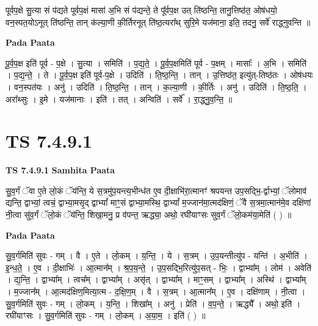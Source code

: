\documentclass[17pt]{extarticle}
\begin{document}
पूर्वप॒क्षे सु॒त्या सं प॑द्यते पूर्वप॒क्षं मासा॑ अ॒भि सं प॑द्यन्ते॒ ते पू᳚र्वप॒क्ष उत् ति॑ष्ठन्ति॒ तानु॒त्तिष्ठ॑त॒ ओष॑धयो॒ वन॒स्पत॒योऽनूत् ति॑ष्ठन्ति॒ तान् क॑ल्या॒णी की॒र्तिरनूत् ति॑ष्ठ॒त्यरा᳚थ् सुरि॒मे यज॑माना॒ इति॒ तदनु॒ सर्वे॑ राद्ध्नुवन्ति ॥ \newline

\textbf{Pada Paata} \newline

पू॒र्व॒प॒क्ष इति॑ पूर्व - प॒क्षे । सु॒त्या । समिति॑ । प॒द्य॒ते॒ । पू॒र्व॒प॒क्षमिति॑ पूर्व - प॒क्षम् । मासाः᳚ । अ॒भि । समिति॑ । प॒द्य॒न्ते॒ । ते । पू॒र्व॒प॒क्ष इति॑ पूर्व-प॒क्षे । उदिति॑ । ति॒ष्ठ॒न्ति॒ । तान् । उ॒त्तिष्ठ॑त॒ इत्यु॑त्-तिष्ठ॑तः । ओष॑धयः । वन॒स्पत॑यः । अनु॑ । उदिति॑ । ति॒ष्ठ॒न्ति॒ । तान् । क॒ल्या॒णी । की॒र्तिः । अनु॑ । उदिति॑ । ति॒ष्ठ॒ति॒ । अरा᳚थ्सुः । इ॒मे । यज॑मानाः । इति॑ । तत् । अन्विति॑ । सर्वे᳚ । रा॒द्ध्नु॒व॒न्ति॒ ॥  \newline




\section*{ TS 7.4.9.1 }

\textbf{TS 7.4.9.1 } \newline
\textbf{Samhita Paata} \newline

सु॒व॒र्गं ॅवा ए॒ते लो॒कं ॅय॑न्ति॒ ये स॒त्रमु॑प॒यन्त्य॒भीन्ध॑त ए॒व दी॒क्षाभि॑रा॒त्मानꣳ॑ श्रपयन्त उप॒सद्भि॒-र्द्वाभ्यां॒ ॅलोमाव॑ द्यन्ति॒ द्वाभ्यां॒ त्वचं॒ द्वाभ्या॒मसृ॒द् द्वाभ्यां᳚ माꣳ॒॒सं द्वाभ्या॒मस्थि॒ द्वाभ्यां᳚ म॒ज्जान॑मा॒त्मद॑क्षिणं॒ ॅवै स॒त्रमा॒त्मान॑मे॒व दक्षि॑णां नी॒त्वा सु॑व॒र्गं ॅलो॒कं ॅय॑न्ति॒ शिखा॒मनु॒ प्र व॑पन्त॒ ऋद्ध्या॒ अथो॒ रघी॑याꣳसः सुव॒र्गं ॅलो॒कम॑या॒मेति॑ ( ) ॥ \newline

\textbf{Pada Paata} \newline

सु॒व॒र्गमिति॑ सुवः - गम् । वै । ए॒ते । लो॒कम् । य॒न्ति॒ । ये । स॒त्रम् । उ॒प॒यन्तीत्यु॑प - यन्ति॑ । अ॒भीति॑ । इ॒न्ध॒ते॒ । ए॒व । दी॒क्षाभिः॑ । आ॒त्मान᳚म् । श्र॒प॒य॒न्ते॒ । उ॒प॒सद्भि॒रित्यु॑प॒सत् - भिः॒ । द्वाभ्या᳚म् । लोम॑ । अवेति॑ । द्य॒न्ति॒ । द्वाभ्या᳚म् । त्वच᳚म् । द्वाभ्या᳚म् । असृ॑त् । द्वाभ्या᳚म् । माꣳ॒॒सम् । द्वाभ्या᳚म् । अस्थि॑ । द्वाभ्या᳚म् । म॒ज्जान᳚म् । आ॒त्मद॑क्षिण॒मित्या॒त्म - द॒क्षि॒ण॒म् । वै । स॒त्रम् । आ॒त्मान᳚म् । ए॒व । दक्षि॑णाम् । नी॒त्वा । सु॒व॒र्गमिति॑ सुवः - गम् । लो॒कम् । य॒न्ति॒ । शिखा᳚म् । अनु॑ । प्रेति॑ । व॒प॒न्ते॒ । ऋद्ध्यै᳚ । अथो॒ इति॑ । रघी॑याꣳसः । सु॒व॒र्गमिति॑ सुवः - गम् । लो॒कम् । अ॒या॒म॒ । इति॑ ( ) ॥  \newline
\end{document}
